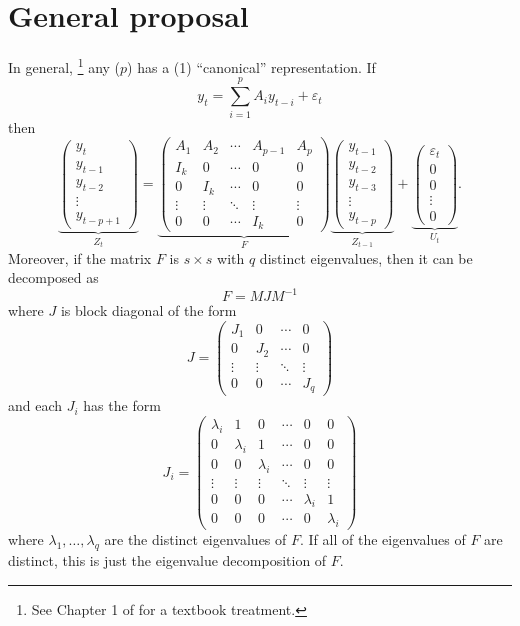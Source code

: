 \documentclass[12pt,fleqn]{article}
\newcommand{\vep}{\varepsilon}
\begin{document}
\section{General proposal}

In general,%
\footnote{See Chapter 1 of \citet{Ham:94} for a textbook treatment.} %
any \VAR($p$) has a \VAR(1) ``canonical'' representation. If
\[
y_t = \sum_{i=1}^p A_i y_{t-i} + \vep_t
\]
then
\[
\underbrace{\begin{pmatrix}
  y_t \\ y_{t-1} \\ y_{t-2} \\ \vdots \\ y_{t-p+1}
\end{pmatrix}}_{Z_t}
=
\underbrace{\begin{pmatrix}
  A_1 & A_2 & \cdots & A_{p-1} & A_p \\
  I_k & 0   & \cdots & 0 & 0 \\
  0  & I_k  & \cdots & 0 & 0 \\
  \vdots & \vdots & \ddots & \vdots & \vdots \\
  0 & 0 & \cdots & I_k & 0 
\end{pmatrix}}_{F}
\underbrace{\begin{pmatrix}
  y_{t-1} \\ y_{t-2} \\ y_{t-3} \\ \vdots \\ y_{t-p}
\end{pmatrix}}_{Z_{t-1}}
+
\underbrace{\begin{pmatrix}
  \vep_{t} \\ 0 \\ 0 \\ \vdots \\ 0
\end{pmatrix}}_{U_t}.
\]
Moreover, if the matrix $F$ is $s \times s$ with $q$ distinct
eigenvalues, then it can be decomposed as
\[
F = M J M^{-1}
\]
where $J$ is block diagonal of the form
\[
J = \begin{pmatrix}
  J_1 & 0 & \cdots & 0 \\
  0 & J_2 & \cdots & 0 \\
  \vdots & \vdots & \ddots & \vdots \\
  0 & 0 & \cdots & J_q
\end{pmatrix}
\]
and each $J_i$ has the form
\[
J_i =
\begin{pmatrix}
  \lambda_i & 1 & 0 & \cdots & 0 & 0 \\
  0 & \lambda_i & 1 & \cdots & 0 & 0 \\
  0 & 0 & \lambda_i & \cdots & 0 & 0 \\
  \vdots & \vdots & \vdots & \ddots & \vdots & \vdots \\
  0 & 0 & 0 & \cdots & \lambda_i & 1 \\
  0 & 0 & 0 & \cdots & 0 & \lambda_i
\end{pmatrix}
\]
where $\lambda_1,\dots,\lambda_q$ are the distinct eigenvalues of $F$.
If all of the eigenvalues of $F$ are distinct, this is just the
eigenvalue decomposition of $F$.
\end{document}
